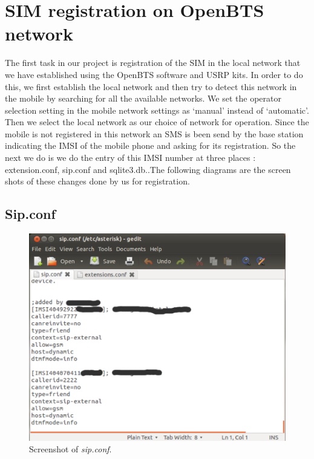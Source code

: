 \chapter{SIM registration on OpenBTS network}

The first task in our project is registration of the SIM in the local network
that we have established using the OpenBTS software and USRP kits. In order to
do this, we first establish the local network and then try to detect this
network in the mobile by searching for all the available networks. We set the
operator selection setting in the mobile network settings as ‘manual’ instead
of ‘automatic’. Then we select the local network as our choice of network for
operation. Since the mobile is not registered in this network an SMS is been
send by the base station indicating the IMSI of the mobile phone and asking
for its registration. So the next we do is we do the entry of this IMSI number
at three places : extension.conf, sip.conf and sqlite3.db..The following
diagrams are the screen shots of these changes done by us for registration. 

\section{Sip.conf}

\begin{figure}
  \centering
    \includegraphics[width=\textwidth]{../images/sip_conf}
  \caption[sip.conf]{Screenshot of \emph{sip.conf}.}
  \label{sip_conf}
\end{figure}

